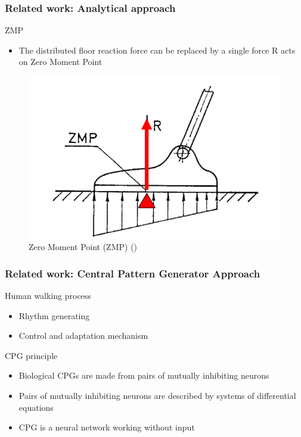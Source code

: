 \documentclass{beamer}
\begin{document}
	\begin{frame}
		\frametitle{Related work: Analytical approach}
		\begin{block}{ZMP}
			\begin{itemize}
				\item
				The distributed floor reaction force can be replaced by a single force R
				acts on Zero Moment Point
			\end{itemize}
		\end{block}
		
		\begin{figure}[h!]
			\begin{minipage}[H]{\linewidth}
				\centering
				\includegraphics[width=0.5\linewidth]{presentation_images/8}
				\caption{Zero Moment Point (ZMP) (\cite{vukobratovic2004zero})}
			\end{minipage}
		\end{figure}
	\end{frame}
	
	
	\begin{frame}
		\frametitle{Related work: Central Pattern Generator Approach}
		\begin{block}{Human walking process}
			\begin{itemize}
				\item
				Rhythm generating
				\item
				Control and adaptation mechanism
				
			\end{itemize}
		\end{block}
		\begin{block}{CPG principle}
			\begin{itemize}
				\item
				Biological CPGs are made from pairs of mutually inhibiting neurons
				\item
				Pairs of mutually inhibiting neurons are described by systems of differential equations
				\item
				CPG is a neural network working without input
			\end{itemize}
		\end{block}
	\end{frame}
	
\end{document}
